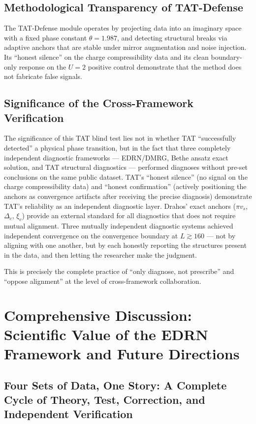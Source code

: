 \documentclass[prb,reprint,twocolumn,superscriptaddress]{revtex4-2}
\begin{document}
\subsection{Methodological Transparency of TAT-Defense}

The TAT-Defense module operates by projecting data into an imaginary space with a fixed phase constant $\theta = 1.987$, and detecting structural breaks via adaptive anchors that are stable under mirror augmentation and noise injection. Its ``honest silence'' on the charge compressibility data and its clean boundary-only response on the $U=2$ positive control demonstrate that the method does not fabricate false signals.

\subsection{Significance of the Cross-Framework Verification}

The significance of this TAT blind test lies not in whether TAT ``successfully detected'' a physical phase transition, but in the fact that three completely independent diagnostic frameworks --- EDRN/DMRG, Bethe ansatz exact solution, and TAT structural diagnostics --- performed diagnoses without pre-set conclusions on the same public dataset. TAT's ``honest silence'' (no signal on the charge compressibility data) and ``honest confirmation'' (actively positioning the anchors as convergence artifacts after receiving the precise diagnosis) demonstrate TAT's reliability as an independent diagnostic layer. Drahos' exact anchors ($\pi v_s$, $\Delta_c$, $\xi_c$) provide an external standard for all diagnostics that does not require mutual alignment. Three mutually independent diagnostic systems achieved independent convergence on the convergence boundary at $L \gtrsim 160$ --- not by aligning with one another, but by each honestly reporting the structures present in the data, and then letting the researcher make the judgment.

This is precisely the complete practice of ``only diagnose, not prescribe'' and ``oppose alignment'' at the level of cross-framework collaboration.


\section{Comprehensive Discussion: Scientific Value of the EDRN Framework and Future Directions}\label{sec:discussion2}

\subsection{Four Sets of Data, One Story: A Complete Cycle of Theory, Test, Correction, and Independent Verification}
\end{document}
